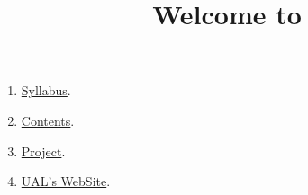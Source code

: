
%
\title{Welcome to \SM{}}

\maketitle

\begin{enumerate}
\item \href{https://sistemas-multimedia.github.io/syllabus}{Syllabus}.  %
\item \href{https://sistemas-multimedia.github.io/contents/index.html}{Contents}.  %
\item \href{https://github.com/Sistemas-Multimedia/VCF}{Project}.  %
\item \href{https://www.ual.es/estudios/masteres/presentacion/plandeestudios/asignatura/7114/71142105}{UAL's WebSite}.  %
\end{enumerate}
